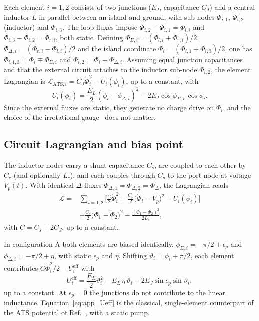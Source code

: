 \documentclass[aps,prx,reprint,floatfix,amsmath,amssymb,longbibliography]{revtex4-2}
\begin{document}
Each element $i=1,2$ consists of two junctions ($E_J$, capacitance $C_J$)
and a central inductor $L$ in parallel between an island and ground, with
sub-nodes $\Phi_{i,1}$, $\Phi_{i,2}$ (inductor) and $\Phi_{i,3}$. The loop
fluxes impose $\Phi_{i,2}-\Phi_{i,1}=\Phi_{l,i}$ and
$\Phi_{i,3}-\Phi_{i,2}=\Phi_{r,i}$, both static. Defining
$\Phi_{\Sigma,i}=(\Phi_{l,i}+\Phi_{r,i})/2$,
$\Phi_{\Delta,i}=(\Phi_{r,i}-\Phi_{l,i})/2$ and the island coordinate
$\Phi_i=(\Phi_{i,1}+\Phi_{i,3})/2$, one has
$\Phi_{i,1,3}=\Phi_i\mp\Phi_{\Sigma,i}$ and $\Phi_{i,2}=\Phi_i-\Phi_{\Delta,i}$.
Assuming equal junction capacitances and that the external circuit
attaches to the inductor sub-node $\Phi_{i,2}$, the element Lagrangian is
$\mathcal{L}_{\mathrm{ATS},i}=C_J\dot{\Phi}_i^2-U_i(\phi_i)$, up to a
constant, with
\begin{equation}
  U_i(\phi_i)=\frac{E_L}{2}\left(\phi_i-\phi_{\Delta,i}\right)^2
  -2E_J\cos\phi_{\Sigma,i}\,\cos\phi_i .
  \label{eq:app_U}
\end{equation}
Since the external fluxes are static, they generate no charge drive on
$\Phi_i$, and the choice of the irrotational gauge~\cite{You2019May} does
not matter.

\subsection{Circuit Lagrangian and bias point}

The inductor nodes carry a shunt capacitance $C_s$, are coupled to each
other by $C_c$ (and optionally $L_c$), and each couples through $C_p$ to
the port node at voltage $V_p(t)$. With identical $\Delta$-fluxes
$\Phi_{\Delta,1}=\Phi_{\Delta,2}=\Phi_\Delta$, the Lagrangian reads
\begin{equation}
\begin{aligned}
  \mathcal{L}={}&\sum_{i=1,2}\Big[\frac{C}{2}\dot{\Phi}_i^2
  +\frac{C_p}{2}\big(\dot{\Phi}_i-V_p\big)^2
  -U_i(\phi_i)\Big]\\
  &+\frac{C_c}{2}\big(\dot{\Phi}_1-\dot{\Phi}_2\big)^2
  -\frac{(\Phi_1-\Phi_2)^2}{2L_c},
\end{aligned}
\label{eq:app_L}
\end{equation}
with $C=C_s+2C_J$, up to a constant.

In configuration A both elements are biased identically,
$\phi_{\Sigma,i}=-\pi/2+\epsilon_p$ and $\phi_{\Delta,i}=-\pi/2+\eta$,
with static $\epsilon_p$ and $\eta$. Shifting $\vartheta_i=\phi_i+\pi/2$,
each element contributes $C\dot{\Phi}_i^2/2-U_i^{\mathrm{eff}}$ with
\begin{equation}
  U_i^{\mathrm{eff}}=\frac{E_L}{2}\vartheta_i^2-E_L\,\eta\,\vartheta_i
  -2E_J\sin\epsilon_p\sin\vartheta_i,
  \label{eq:app_Ueff}
\end{equation}
up to a constant. At $\epsilon_p=0$ the junctions do not contribute to the
linear inductance. Equation~\eqref{eq:app_Ueff} is the classical,
single-element counterpart of the ATS potential of
Ref.~\cite{Carde2025Feb}, with a static pump.
\end{document}
